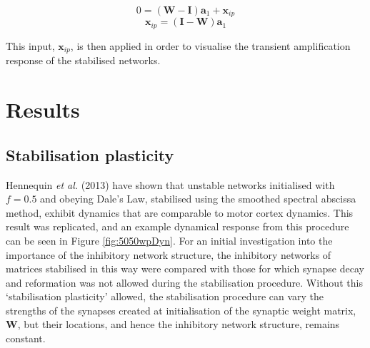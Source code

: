 \documentclass[12pt, a4paper]{article}
\begin{document}
    \begin{equation} 0 = (\mathbf{W} - \mathbf{I})\mathbf{a}_1 + \mathbf{x}_{ip}      \end{equation}
    \begin{equation} \mathbf{x}_{ip} = (\mathbf{I} - \mathbf{W})\mathbf{a}_1          \end{equation}

This input, $\mathbf{x}_{ip}$, is then applied in order to visualise the transient amplification response of the stabilised networks.



\FloatBarrier
\pagebreak
\section{Results}

\subsection{Stabilisation plasticity}
\label{sec:stabPlast}
Hennequin \emph{et al.} (2013) have shown that unstable networks initialised with $f = 0.5$ and obeying Dale's Law, stabilised using the smoothed spectral abscissa method, exhibit dynamics that are comparable to motor cortex dynamics.  This result was replicated, and an example dynamical response from this procedure can be seen in Figure \ref{fig:5050wpDyn}.  For an initial investigation into the importance of the inhibitory network structure, the inhibitory networks of matrices stabilised in this way were compared with those for which synapse decay and reformation was not allowed during the stabilisation procedure.  Without this `stabilisation plasticity' allowed, the stabilisation procedure can vary the strengths of the synapses created at initialisation of the synaptic weight matrix, $\mathbf{W}$, but their locations, and hence the inhibitory network structure, remains constant.
\end{document}
